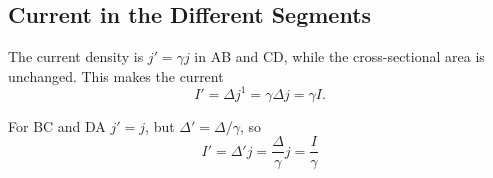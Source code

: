 \documentclass[11pt]{amsart}
\begin{document}
\subsection{Current in the Different Segments}
The current density is $j' = \gamma j$ in AB and CD, while the cross-sectional area is unchanged. This makes the current
\begin{equation}
I' = \Delta j^1 = \gamma\Delta j = \gamma I.
\end{equation}

For BC and DA $j' = j$, but $\Delta' = \Delta / \gamma$, so
\begin{equation}
I' = \Delta'j = \frac{\Delta}{\gamma}j = \frac{I}{\gamma}
\end{equation}
\end{document}
